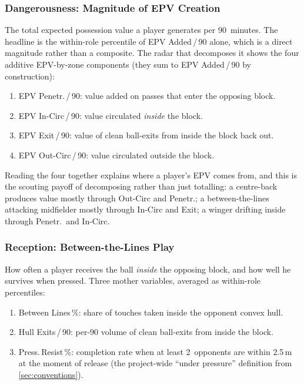 \documentclass[12pt,a4paper]{article}
\begin{document}
\subsubsection{Dangerousness: Magnitude of EPV Creation}\label{sec:dangerousness}

The total expected possession value a player generates per 90~minutes.
The headline is the within-role percentile of EPV Added\,/\,90 alone, which is a direct magnitude rather than a composite.
The radar that decomposes it shows the four additive EPV-by-zone components (they sum to EPV Added\,/\,90 by construction):

\begin{enumerate}
    \item EPV Penetr.\,/\,90: value added on passes that enter the opposing block.
    \item EPV In-Circ\,/\,90: value circulated \emph{inside} the block.
    \item EPV Exit\,/\,90: value of clean ball-exits from inside the block back out.
    \item EPV Out-Circ\,/\,90: value circulated outside the block.
\end{enumerate}

Reading the four together explains where a player's EPV comes from, and this is the scouting payoff of decomposing rather than just totalling: a centre-back produces value mostly through Out-Circ and Penetr.; a between-the-lines attacking midfielder mostly through In-Circ and Exit; a winger drifting inside through Penetr.\ and In-Circ.

\subsubsection{Reception: Between-the-Lines Play}\label{sec:reception}

How often a player receives the ball \emph{inside} the opposing block, and how well he survives when pressed.
Three mother variables, averaged as within-role percentiles:

\begin{enumerate}
    \item Between Lines\,\%: share of touches taken inside the opponent convex hull.
    \item Hull Exits\,/\,90: per-90 volume of clean ball-exits from inside the block.
    \item Press.\,Resist\,\%: completion rate when at least 2~opponents are within 2.5\,m at the moment of release (the project-wide ``under pressure'' definition from \cref{sec:conventions}).
\end{enumerate}
\end{document}
